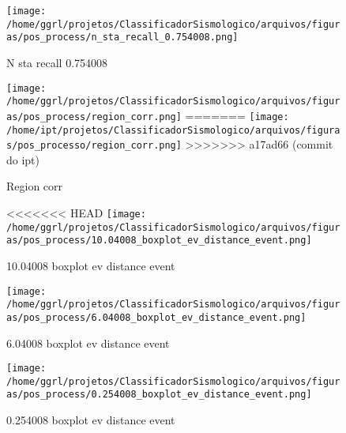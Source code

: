                     \begin{figure}[H]
                        \centering
                        \texttt{[image: /home/ggrl/projetos/ClassificadorSismologico/arquivos/figuras/pos\_process/n\_sta\_recall\_0.754008.png]}
                        \caption{N sta recall 0.754008}
                        \label{fig:n_sta_recall_0.754008}
                    \end{figure}
                

                    \begin{figure}[H]
                        \centering
                        \texttt{[image: /home/ggrl/projetos/ClassificadorSismologico/arquivos/figuras/pos\_process/region\_corr.png]}
=======
                        \texttt{[image: /home/ipt/projetos/ClassificadorSismologico/arquivos/figuras/pos\_processo/region\_corr.png]}
>>>>>>> a17ad66 (commit do ipt)
                        \caption{Region corr}
                        \label{fig:region_corr}
                    \end{figure}
                

                    \begin{figure}[H]
                        \centering
<<<<<<< HEAD
                        \texttt{[image: /home/ggrl/projetos/ClassificadorSismologico/arquivos/figuras/pos\_process/10.04008\_boxplot\_ev\_distance\_event.png]}
                        \caption{10.04008 boxplot ev distance event}
                        \label{fig:10.04008_boxplot_ev_distance_event}
                    \end{figure}
                

                    \begin{figure}[H]
                        \centering
                        \texttt{[image: /home/ggrl/projetos/ClassificadorSismologico/arquivos/figuras/pos\_process/6.04008\_boxplot\_ev\_distance\_event.png]}
                        \caption{6.04008 boxplot ev distance event}
                        \label{fig:6.04008_boxplot_ev_distance_event}
                    \end{figure}
                

                    \begin{figure}[H]
                        \centering
                        \texttt{[image: /home/ggrl/projetos/ClassificadorSismologico/arquivos/figuras/pos\_process/0.254008\_boxplot\_ev\_distance\_event.png]}
                        \caption{0.254008 boxplot ev distance event}
                        \label{fig:0.254008_boxplot_ev_distance_event}
                    \end{figure}
                

